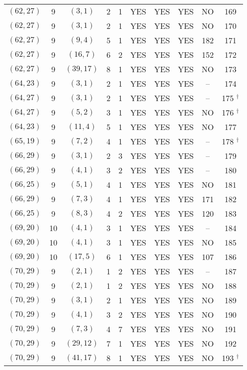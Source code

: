 \begin{longtable}{|c|c|c|c|c|c|c|c|c|c|}
$(62, 27)$ & 9 & $(3, 1)$ & 2 & 1 & YES & YES & YES & NO & 169\\
$(62, 27)$ & 9 & $(3, 1)$ & 2 & 1 & YES & YES & YES & NO & 170\\
$(62, 27)$ & 9 & $(9, 4)$ & 5 & 1 & YES & YES & YES & 182 & 171\\
$(62, 27)$ & 9 & $(16, 7)$ & 6 & 2 & YES & YES & YES & 152 & 172\\
$(62, 27)$ & 9 & $(39, 17)$ & 8 & 1 & YES & YES & YES & NO & 173\\
$(64, 23)$ & 9 & $(3, 1)$ & 2 & 1 & YES & YES & YES & -- & 174\\
$(64, 27)$ & 9 & $(3, 1)$ & 2 & 1 & YES & YES & YES & -- & 175 ${}^\dagger$\\
$(64, 27)$ & 9 & $(5, 2)$ & 3 & 1 & YES & YES & YES & NO & 176 ${}^\dagger$\\
$(64, 23)$ & 9 & $(11, 4)$ & 5 & 1 & YES & YES & YES & NO & 177\\
$(65, 19)$ & 9 & $(7, 2)$ & 4 & 1 & YES & YES & YES & -- & 178 ${}^\dagger$\\
$(66, 29)$ & 9 & $(3, 1)$ & 2 & 3 & YES & YES & YES & -- & 179\\
$(66, 29)$ & 9 & $(4, 1)$ & 3 & 2 & YES & YES & YES & -- & 180\\
$(66, 25)$ & 9 & $(5, 1)$ & 4 & 1 & YES & YES & YES & NO & 181\\
$(66, 29)$ & 9 & $(7, 3)$ & 4 & 1 & YES & YES & YES & 171 & 182\\
$(66, 25)$ & 9 & $(8, 3)$ & 4 & 2 & YES & YES & YES & 120 & 183\\
$(69, 20)$ & 10 & $(4, 1)$ & 3 & 1 & YES & YES & YES & -- & 184\\
$(69, 20)$ & 10 & $(4, 1)$ & 3 & 1 & YES & YES & YES & NO & 185\\
$(69, 20)$ & 10 & $(17, 5)$ & 6 & 1 & YES & YES & YES & 107 & 186\\
$(70, 29)$ & 9 & $(2, 1)$ & 1 & 2 & YES & YES & YES & -- & 187\\
$(70, 29)$ & 9 & $(2, 1)$ & 1 & 2 & YES & YES & YES & NO & 188\\
$(70, 29)$ & 9 & $(3, 1)$ & 2 & 1 & YES & YES & YES & NO & 189\\
$(70, 29)$ & 9 & $(4, 1)$ & 3 & 2 & YES & YES & YES & NO & 190\\
$(70, 29)$ & 9 & $(7, 3)$ & 4 & 7 & YES & YES & YES & NO & 191\\
$(70, 29)$ & 9 & $(29, 12)$ & 7 & 1 & YES & YES & YES & NO & 192\\
$(70, 29)$ & 9 & $(41, 17)$ & 8 & 1 & YES & YES & YES & NO & 193 ${}^\dagger$\\

\end{longtable}
